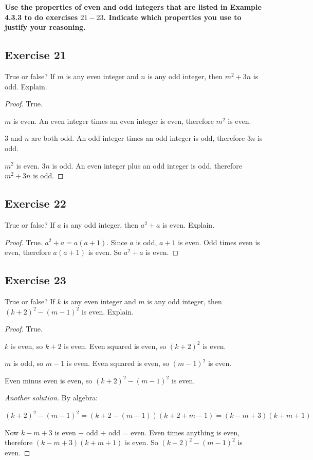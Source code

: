 \documentclass[14pt]{extarticle}
\newcommand{\cy}{\color{cyan}}
\begin{document}
{\bf \cy Use the properties of even and odd integers that are listed in Example 4.3.3 to do exercises $21-23$. Indicate which properties you use to justify your reasoning.}

\subsection{Exercise 21}
True or false? If $m$ is any even integer and $n$ is any
odd integer, then $m^2 + 3n$ is odd. Explain.

\begin{proof}
True. 

$m$ is even. An even integer times an even integer is even, therefore $m^2$ is even. 

$3$ and $n$ are both odd. An odd integer times an odd integer is odd, therefore $3n$ is odd. 

$m^2$ is even. $3n$ is odd. An even integer plus an odd integer is odd, therefore $m^2 + 3n$ is odd.
\end{proof}

\subsection{Exercise 22}
True or false? If $a$ is any odd integer, then $a^2 + a$ is
even. Explain.

\begin{proof}
True. $a^2 + a = a(a+1)$. Since $a$ is odd, $a+1$ is even. Odd times even is even, therefore $a(a+1)$ is even. So $a^2+a$ is even.
\end{proof}

\subsection{Exercise 23}
True or false? If $k$ is any even integer and $m$ is any
odd integer, then $(k + 2)^2 - (m - 1)^2$ is even. Explain.

\begin{proof}
True. 

$k$ is even, so $k+2$ is even. Even squared is even, so $(k + 2)^2$ is even.

$m$ is odd, so $m-1$ is even. Even squared is even, so $(m - 1)^2$ is even.

Even minus even is even, so $(k + 2)^2 - (m - 1)^2$ is even.

{\it Another solution.} By algebra:

$(k + 2)^2 - (m - 1)^2 = (k+2-(m-1))(k+2+m-1) = (k-m+3)(k+m+1)$

Now $k-m+3$ is even $-$ odd $+$ odd = even. Even times anything is even, therefore $(k-m+3)(k+m+1)$ is even. So $(k + 2)^2 - (m - 1)^2$ is even.
\end{proof}
\end{document}
